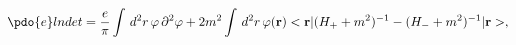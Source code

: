 \begin{equation}
\label{Eq_0201}
\pdo{e} lndet =
  \frac{e}{\pi}
  \int \, d^2r \, \varphi \, \partial^2 \varphi +
  2 m^2 \int \, d^2r \, \varphi(\textbf{r})\\
  <\textbf{r} | (H_+ + m^2)^{-1} - (H_- + m^2)^{-1}|\textbf{r}>,
\end{equation}


